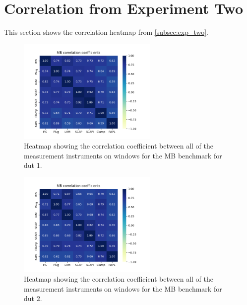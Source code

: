 \section*{Correlation from Experiment Two}\label{app:cor_exp_two}

This section shows the correlation heatmap from \cref{subsec:exp_two}.


\begin{figure}[H]
    \centering
    \hspace*{-1cm} %
    \includegraphics[width=0.6\textwidth]{figures/MandelbrotDut1.png}
    \caption{Heatmap showing the correlation coefficient between all of the measurement instruments on windows for the MB benchmark for dut 1.}
    \label{fig:mandelbrotCorrDut1}
\end{figure}
\begin{figure}[H]
    \centering
    \hspace*{-1cm} %
    \includegraphics[width=0.6\textwidth]{figures/MandelbrotDut2.png}
    \caption{Heatmap showing the correlation coefficient between all of the measurement instruments on windows for the MB benchmark for dut 2.}
    \label{fig:mandelbrotCorrDut2}
\end{figure}

